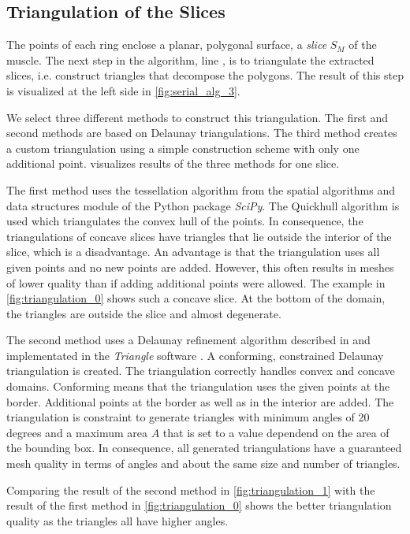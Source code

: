 \subsection{Triangulation of the Slices}\label{sec:triangulation_of_the_slices}
The points of each ring enclose a planar, polygonal surface, a \emph{slice} $S_M$ of the muscle.
The next step in the algorithm, line , is to triangulate the extracted slices, i.e. construct triangles that decompose the polygons. The result of this step is visualized at the left side in \cref{fig:serial_alg_3}.

We select three different methods to construct this triangulation. The first and second methods are based on Delaunay triangulations. The third method creates a custom triangulation using a simple construction scheme with only one additional point.
 visualizes results of the three methods for one slice.

The first method uses the tessellation algorithm from the spatial algorithms and data structures module of the Python package \emph{SciPy}. 
The Quickhull algorithm \cite{quickhull} is used which triangulates the convex hull of the points. In consequence, the triangulations of concave slices have triangles that lie outside the interior of the slice, which is a disadvantage. An advantage is that the triangulation uses all given points and no new points are added. However, this often results in meshes of lower quality than if adding additional points were allowed.
The example in \cref{fig:triangulation_0} shows such a concave slice. At the bottom of the domain, the triangles are outside the slice and almost degenerate.

The second method uses a Delaunay refinement algorithm described in \cite{Delaunay2002} and implementated in the \emph{Triangle} software \cite{shewchuk96b}. A conforming, constrained Delaunay triangulation is created. The triangulation correctly handles convex and concave domains.
Conforming means that the triangulation uses the given points at the border. Additional points at the border as well as in the interior are added. The triangulation is constraint to generate triangles with minimum angles of 20 degrees and a maximum area $A$ that is set to a value dependend on the area of the bounding box. In consequence, all generated triangulations have a guaranteed mesh quality in terms of angles and about the same size and number of triangles.

Comparing the result of the second method in \cref{fig:triangulation_1} with the result of the first method in \cref{fig:triangulation_0} shows the better triangulation quality as the triangles all have higher angles.

